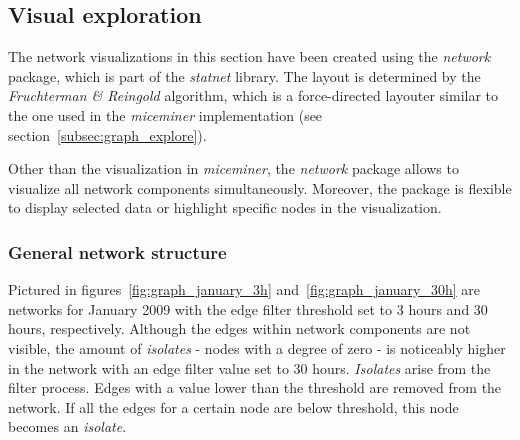 \subsection{Visual exploration}
\label{subsec:visual_exploration}

The network visualizations in this section have been created using the \textit{network}\cite{network:08} package, which is part of the \textit{statnet}\cite{statnet:03} library. The layout is determined by the \textit{Fruchterman \& Reingold}\cite{fruchterman:91} algorithm, which is a force-directed layouter similar to the one used in the \textit{miceminer} implementation (see section~\ref{subsec:graph_explore}).

Other than the visualization in \textit{miceminer}, the \textit{network} package allows to visualize all network components simultaneously. Moreover, the package is flexible to display selected data or highlight specific nodes in the visualization. 

\subsubsection{General network structure}
\label{subsubsec:vis_general}    

Pictured in figures~\ref{fig:graph_january_3h} and~\ref{fig:graph_january_30h} are networks for January 2009 with the edge filter threshold set to 3 hours and 30 hours, respectively. Although the edges within network components are not visible, the amount of \textit{isolates} - nodes with a degree of zero - is noticeably higher in the network with an edge filter value set to 30 hours. \textit{Isolates} arise from the filter process. Edges with a value lower than the threshold are removed from the network. If all the edges for a certain node are below threshold, this node becomes an \textit{isolate}. 

